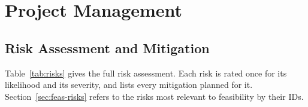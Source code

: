 

\chapter{Project Management}

\renewcommand{\thefigure}{A.\arabic{figure}}
\section{Risk Assessment and Mitigation}
\label{app:risks}

Table~\ref{tab:risks} gives the full risk assessment. Each risk is rated once for its likelihood and its severity, and lists every mitigation planned for it. Section~\ref{sec:feas-risks} refers to the risks most relevant to feasibility by their IDs.

